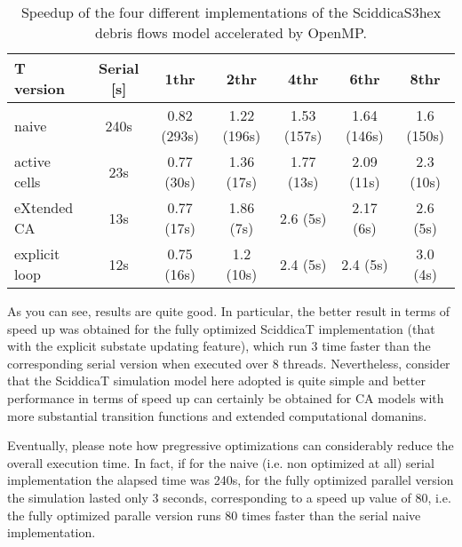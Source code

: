 \begin{table}
  \centering
  \footnotesize
  \begin{tabular}{l|c|c|c|c|c|c}
    \hline
    T version & Serial [s] & 1thr & 2thr & 4thr & 6thr & 8thr\\
    \hline
    \hline
    naive         & 240s & 0.82 (293s) & 1.22 (196s) & 1.53 (157s) & 1.64 (146s) & 1.6 (150s)\\
    active cells  & 23s  & 0.77 (30s)  & 1.36 (17s)  & 1.77 (13s)  & 2.09 (11s)  & 2.3 (10s)\\
    eXtended CA   & 13s  & 0.77 (17s)  & 1.86 (7s)   & 2.6  (5s)   & 2.17  (6s)  & 2.6 (5s)\\
    explicit loop & 12s  & 0.75 (16s)  & 1.2  (10s)  & 2.4  (5s)   & 2.4  (5s)   & 3.0 (4s)\\
    \hline
  \end{tabular}
  \caption{Speedup of the four different
    implementations of the SciddicaS3hex debris flows model accelerated by OpenMP.}
  \label{tab:speedup}
\end{table}

As you can see, results are quite good. In particular, the better
result in terms of speed up was obtained for the fully optimized
SciddicaT implementation (that with the explicit substate updating
feature), which run 3 time faster than the corresponding serial
version when executed over 8 threads. Nevertheless, consider that the
SciddicaT simulation model here adopted is quite simple and better
performance in terms of speed up can certainly be obtained for CA
models with more substantial transition functions and extended
computational domanins.

Eventually, please note how pregressive optimizations can considerably
reduce the overall execution time. In fact, if for the naive (i.e. non
optimized at all) serial implementation the alapsed time was 240s, for
the fully optimized parallel version the simulation lasted only 3
seconds, corresponding to a speed up value of 80, i.e. the fully
optimized paralle version runs 80 times faster than the serial naive
implementation.


